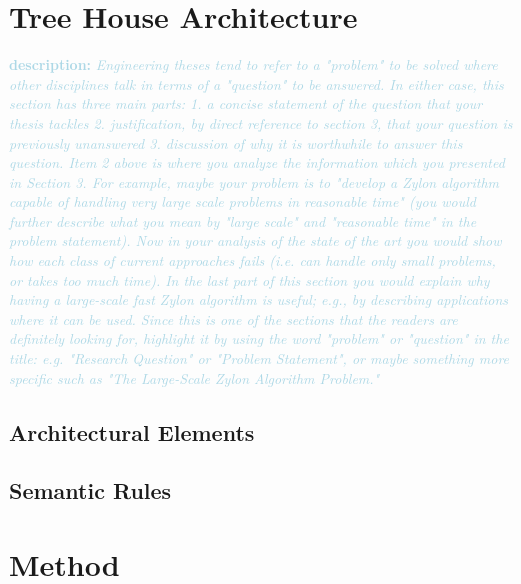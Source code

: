 \documentclass{article}
\newcommand{\desc}[1]{\textcolor{lightblue}{\textbf{\newline description: }\it{#1} \newline}}
\begin{document}
\section{Tree House Architecture}





\desc{
Engineering theses tend to refer to a "problem" to be solved where other disciplines talk in terms of a "question" to be answered. In either case, this section has three main parts:
1. a concise statement of the question that your thesis tackles
2. justification, by direct reference to section 3, that your question is previously unanswered
3. discussion of why it is worthwhile to answer this question.
Item 2 above is where you analyze the information which you presented in Section 3. For example, maybe your problem is to "develop a Zylon algorithm capable of handling very large scale problems in reasonable time" (you would further describe what you mean by "large scale" and "reasonable time" in the problem statement). Now in your analysis of the state of the art you would show how each class of current approaches fails (i.e. can handle only small problems, or takes too much time). In the last part of this section you would explain why having a large-scale fast Zylon algorithm is useful; e.g., by describing applications where it can be used.
Since this is one of the sections that the readers are definitely looking for, highlight it by using the word "problem" or "question" in the title: e.g. "Research Question" or "Problem Statement", or maybe something more specific such as "The Large-Scale Zylon Algorithm Problem." 
}

\subsection{Architectural Elements} 

\subsection{Semantic Rules} 

\section{Method}
\end{document}
